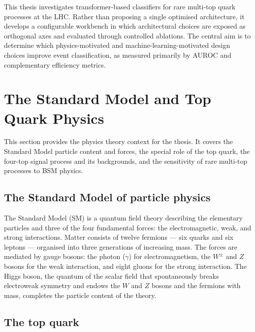 This thesis investigates transformer-based classifiers for rare multi-top quark processes at the LHC.
Rather than proposing a single optimised architecture, it develops a configurable workbench in which architectural choices are exposed as orthogonal axes and evaluated through controlled ablations.
The central aim is to determine which physics-motivated and machine-learning-motivated design choices improve event classification, as measured primarily by AUROC and complementary efficiency metrics.


\section{The Standard Model and Top Quark Physics}
\label{sec:intro_standard_model_and_top_quark_physics}

This section provides the physics theory context for the thesis.
It covers the Standard Model particle content and forces, the special role of the top quark, the four-top signal process and its backgrounds, and the sensitivity of rare multi-top processes to BSM physics.

\subsection{The Standard Model of particle physics}
\label{subsec:intro_standard_model}

The Standard Model (SM) is a quantum field theory describing the elementary particles and three of the four fundamental forces: the electromagnetic, weak, and strong interactions.
Matter consists of twelve fermions --- six quarks and six leptons --- organised into three generations of increasing mass.
The forces are mediated by gauge bosons: the photon ($\gamma$) for electromagnetism, the $W^{\pm}$ and $Z$ bosons for the weak interaction, and eight gluons for the strong interaction.
The Higgs boson, the quantum of the scalar field that spontaneously breaks electroweak symmetry and endows the $W$ and $Z$ bosons and the fermions with mass, completes the particle content of the theory.


\subsection{The top quark}
\label{subsec:intro_top_quark}

